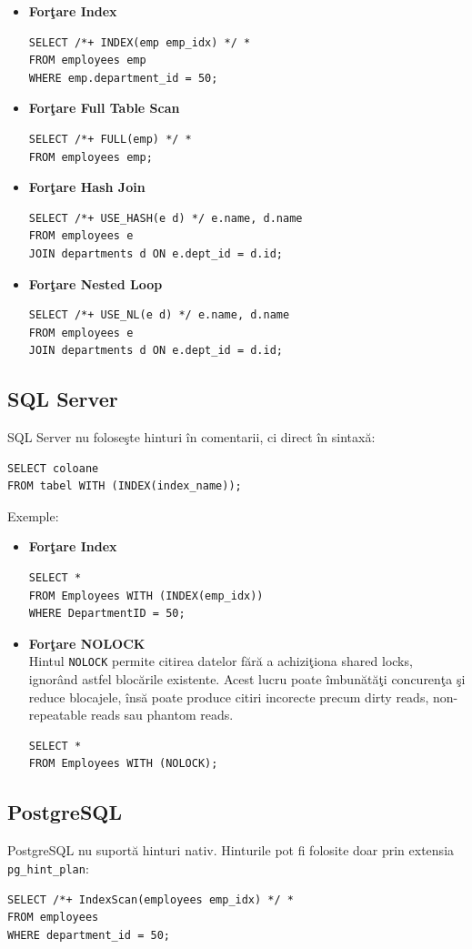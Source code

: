 \documentclass[12pt]{article}
\begin{document}
\begin{itemize}
    \item \textbf{Forţare Index}
\begin{verbatim}
SELECT /*+ INDEX(emp emp_idx) */ *
FROM employees emp
WHERE emp.department_id = 50;
\end{verbatim}

    \item \textbf{Forţare Full Table Scan}
\begin{verbatim}
SELECT /*+ FULL(emp) */ *
FROM employees emp;
\end{verbatim}

    \item \textbf{Forţare Hash Join}
\begin{verbatim}
SELECT /*+ USE_HASH(e d) */ e.name, d.name
FROM employees e
JOIN departments d ON e.dept_id = d.id;
\end{verbatim}

    \item \textbf{Forţare Nested Loop}
\begin{verbatim}
SELECT /*+ USE_NL(e d) */ e.name, d.name
FROM employees e
JOIN departments d ON e.dept_id = d.id;
\end{verbatim}
\end{itemize}

\subsection{SQL Server}

SQL Server nu foloseşte hinturi în comentarii, ci direct în sintaxă:

\begin{verbatim}
SELECT coloane
FROM tabel WITH (INDEX(index_name));
\end{verbatim}

Exemple:

\begin{itemize}
    \item \textbf{Forţare Index}
\begin{verbatim}
SELECT *
FROM Employees WITH (INDEX(emp_idx))
WHERE DepartmentID = 50;
\end{verbatim}

    \item \textbf{Forţare NOLOCK}\\
Hintul \texttt{NOLOCK} permite citirea datelor fără a achiziţiona shared locks, ignorând astfel blocările existente. Acest lucru poate îmbunătăţi concurenţa şi reduce blocajele, însă poate produce citiri incorecte precum dirty reads, non-repeatable reads sau phantom reads.
\begin{verbatim}
SELECT *
FROM Employees WITH (NOLOCK);
\end{verbatim}
\end{itemize}

\subsection{PostgreSQL}

PostgreSQL nu suportă hinturi nativ.  
Hinturile pot fi folosite doar prin extensia \texttt{pg\_hint\_plan}:

\begin{verbatim}
SELECT /*+ IndexScan(employees emp_idx) */ *
FROM employees
WHERE department_id = 50;
\end{verbatim}
\end{document}
